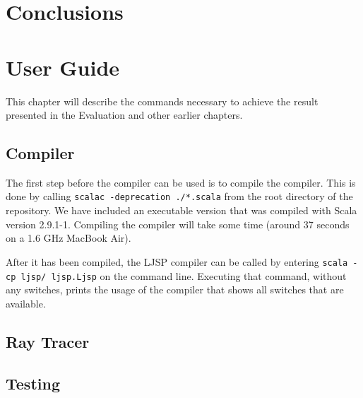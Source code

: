 \documentclass[11pt]{report}
\begin{document}
\chapter{Conclusions}




\chapter{User Guide}

This chapter will describe the commands necessary to achieve the result presented in the Evaluation and other earlier chapters.
\section{Compiler}
The first step before the compiler can be used is to compile the compiler. This is done by calling \texttt{scalac -deprecation ./*.scala} from the root directory of the repository. We have included an executable version that was compiled with Scala version 2.9.1-1. Compiling the compiler will take some time (around 37 seconds on a 1.6 GHz MacBook Air).

After it has been compiled, the LJSP compiler can be called by entering \texttt{scala -cp ljsp/ ljsp.Ljsp} on the command line. Executing that command, without any switches, prints the usage of the compiler that shows all switches that are available.

\section{Ray Tracer}

\section{Testing}

\newpage
\end{document}

